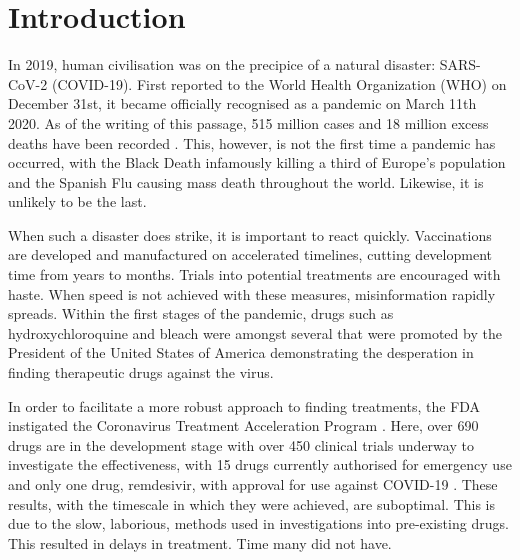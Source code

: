 
\chapter{Introduction}  %

\ifpdf
    \graphicspath{{Chapter1/Figs/Raster/}{Chapter1/Figs/PDF/}{Chapter1/Figs/}}
\else
    \graphicspath{{Chapter1/Figs/Vector/}{Chapter1/Figs/}}
\fi

In 2019, human civilisation was on the precipice of a natural disaster: \mbox{SARS-CoV-2} (\mbox{COVID-19}). First reported to the World Health Organization (WHO) on December 31st, it became officially recognised as a pandemic on March 11th 2020. As of the writing of this passage, 515 million cases and 18 million excess deaths have been recorded \cite{Wan22,WHO22}. This, however, is not the first time a pandemic has occurred, with the Black Death infamously killing a third of Europe's population and the Spanish Flu causing mass death throughout the world. Likewise, it is unlikely to be the last.

When such a disaster does strike, it is important to react quickly. Vaccinations are developed and manufactured on accelerated timelines, cutting development time from years to months. Trials into potential treatments are encouraged with haste. When speed is not achieved with these measures, misinformation rapidly spreads. Within the first stages of the pandemic, drugs such as hydroxychloroquine and bleach were amongst several that were promoted by the President of the United States of America demonstrating the desperation in finding therapeutic drugs against the virus.

In order to facilitate a more robust approach to finding treatments, the FDA instigated the Coronavirus Treatment Acceleration Program \cite{CTAP22}. Here, over 690 drugs are in the development stage with over 450 clinical trials underway to investigate the effectiveness, with 15 drugs currently authorised for emergency use and only one drug, remdesivir, with approval for use against \mbox{COVID-19} \cite{CTAP22}. These results, with the timescale in which they were achieved, are suboptimal. This is due to the slow, laborious, methods used in investigations into pre-existing drugs. This resulted in delays in treatment. Time many did not have.

